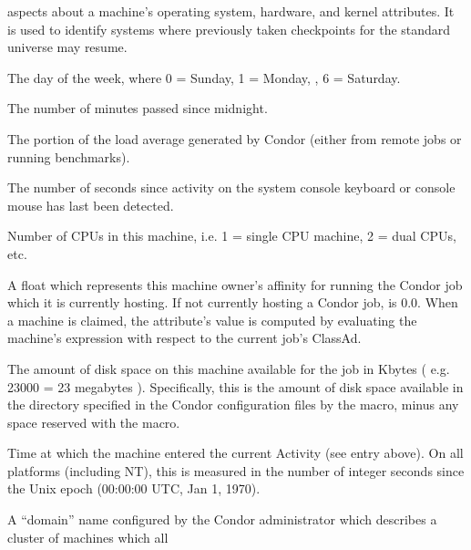 \begin{description}
aspects about a machine's operating system, hardware, and kernel
attributes.
It is used to identify systems where previously taken checkpoints for
the standard universe may resume.
%
\item[\AdAttr{ClockDay}:] The day of the week, where 0 = Sunday, 1 = Monday, \Dots, 6 = Saturday. 
%
\item[\AdAttr{ClockMin}:] The number of minutes passed since midnight.
%
\item[\AdAttr{CondorLoadAvg}:] The portion of the load average generated by Condor (either
from remote jobs or running benchmarks).
%
\item[\AdAttr{ConsoleIdle}:] The number of seconds since activity on the system
console keyboard or console mouse has last been detected.
%
\item[\AdAttr{Cpus}:] Number of CPUs in this machine, i.e. 1 = single CPU machine, 2 = dual
CPUs, etc.
%
\item[\AdAttr{CurrentRank}:] A float which represents this machine
owner's affinity
for running the Condor job which it is currently hosting.  If not
currently hosting a Condor job,  is 0.0.
When a machine is claimed,
the attribute's value is computed by evaluating the machine's
 expression with respect to the current job's ClassAd.
%
\item[\AdAttr{Disk}:] The amount of disk space on this machine available for
the job in Kbytes ( e.g. 23000 = 23 megabytes ).  Specifically, this
is the amount of disk space available in the directory specified in
the Condor configuration files by the  macro, minus any
space reserved with the  macro.
%
\item[\AdAttr{EnteredCurrentActivity}:] Time at which the machine
entered the current Activity (see  entry above).  On
all platforms (including NT), this is measured in the number of
integer seconds since the Unix epoch (00:00:00 UTC, Jan 1, 1970).
%
\item[\AdAttr{FileSystemDomain}:] A ``domain'' name configured by the
Condor administrator which describes a cluster of machines which all

\end{description}
